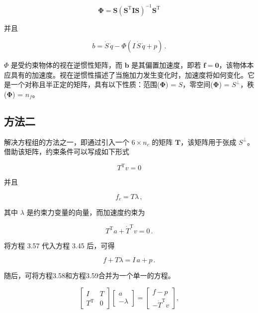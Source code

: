 \documentclass[10pt,a4paper]{book}
\theoremstyle{thmstyle} %
\theoremstyle{defstyle} %
\theoremstyle{prostyle} %
\begin{document}
$$
\boldsymbol { \Phi } = \boldsymbol { S } \left( \boldsymbol { S } ^{\mathrm { T} } \boldsymbol { I } \boldsymbol { S } \right) ^{- 1} \boldsymbol { S } ^{\mathrm { T} }
$$



并且



$$
b = \dot { S } \, \dot { q } - \Phi ( I \, \dot { S } \, \dot { q } + p ) \, .
$$



$\Phi$ 是受约束物体的视在逆惯性矩阵，而 $\boldsymbol{b}$ 是其偏置加速度，即若 $\boldsymbol{f}=\boldsymbol{0}$，该物体本应具有的加速度。视在逆惯性描述了当施加力发生变化时，加速度将如何变化。它是一个对称且半正定的矩阵，具有以下性质：范围($\boldsymbol{\Phi}$) = $S$，零空间($\boldsymbol{\Phi}$) = $S^{\perp}$，秩($\boldsymbol{\Phi}$) = $n_{f}$。



\subsection{方法二}





解决方程组的方法之一，即通过引入一个 $6 \times n_{c}$ 的矩阵 $\boldsymbol{T}$，该矩阵用于张成 $S^{\perp}$。借助该矩阵，约束条件可以写成如下形式



$$
T ^{\mathrm { T} } v = 0
$$



并且



$$
f _ { c } = T \lambda \, ,
$$



其中 $\lambda$ 是约束力变量的向量，而加速度约束为



$$
T ^{\mathrm { T} } a + \dot { T } ^{\mathrm { T} } v = 0 \, .
$$



将方程 3.57 代入方程 3.45 后，可得



$$
f + T \lambda = I \, a + p \, .
$$



随后，可将方程3.58和方程3.59合并为一个单一的方程。



$$
\left[ \begin{array}{ll} { I } & { T } \\{ T ^{\mathrm { T} } } & { 0 } \end{array} \right] \left[ \begin{array}{l} { a } \\{ - \lambda } \end{array} \right] = \left[ \begin{array}{l} { f - p } \\{ - \dot { T } ^{\mathrm { T} } v } \end{array} \right] ,
$$
\end{document}
